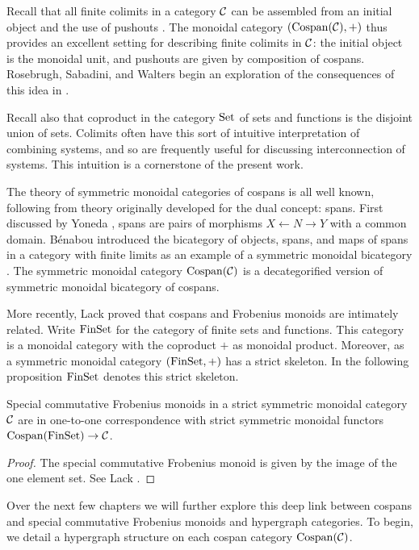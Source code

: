 \begin{remark}
  Recall that all finite colimits in a category $\mathcal C$ can be assembled from an
  initial object and the use of pushouts \cite{Mac98}. The monoidal category
  $(\operatorname{{Cospan}}(\mathcal C),+)$ thus provides an excellent setting for describing finite
  colimits in $\mathcal C$: the initial object is the monoidal unit, and pushouts are
  given by composition of cospans. Rosebrugh, Sabadini, and Walters begin an
  exploration of the consequences of this idea in \cite{RSW08}.
  
  Recall also that coproduct in the category $\mathrm{Set}$ of sets and functions is the
  disjoint union of sets. Colimits often have this sort of intuitive
  interpretation of combining systems, and so are frequently useful for
  discussing interconnection of systems. This intuition is a cornerstone of the
  present work.
\end{remark}

The theory of symmetric monoidal categories of cospans is all well known,
following from theory originally developed for the dual concept: spans. First
discussed by Yoneda \cite{Yon54}, spans are pairs of morphisms $X \leftarrow N
\rightarrow Y$ with a common domain. B\'enabou introduced the bicategory of
objects, spans, and maps of spans in a category with finite limits as an example
of a symmetric monoidal bicategory \cite{Ben67}. The symmetric monoidal category
$\operatorname{{Cospan}}(\mathcal C)$ is a decategorified version of symmetric monoidal bicategory of
cospans.

More recently, Lack proved that cospans and Frobenius monoids are intimately
related. Write $\mathrm{FinSet}$ for the category of finite sets and functions. This
category is a monoidal category with the coproduct $+$ as monoidal product.
Moreover, as a symmetric monoidal category $(\mathrm{FinSet},+)$ has a strict skeleton.
In the following proposition $\mathrm{FinSet}$ denotes this strict skeleton.

\begin{proposition} \label{prop.cospanscfm}
  Special commutative Frobenius monoids in a strict symmetric monoidal category
  $\mathcal C$ are in one-to-one correspondence with strict symmetric monoidal functors
  $\operatorname{{Cospan}}(\mathrm{FinSet}) \to \mathcal C$.
\end{proposition}
\begin{proof}
  The special commutative Frobenius monoid is given by the image of the one
  element set. See Lack \cite{Lac04}.
\end{proof}

Over the next few chapters we will further explore this deep link between
cospans and special commutative Frobenius monoids and hypergraph categories.
To begin, we detail a hypergraph structure on each cospan category $\operatorname{{Cospan}}(\mathcal
C)$. 

